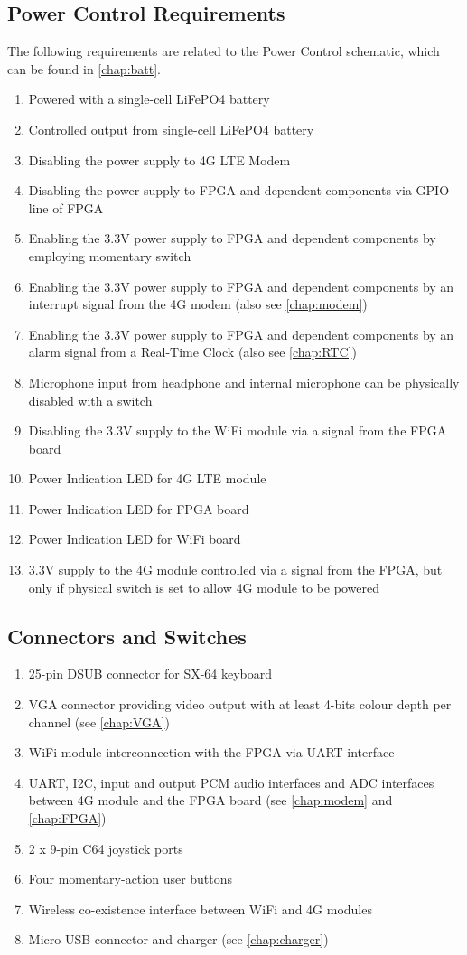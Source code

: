 \subsection{Power Control Requirements}
The following requirements are related to the Power Control schematic, which can be found in \autoref{chap:batt}.
\begin{enumerate}
\item Powered with a single-cell LiFePO4 battery
\item Controlled output from single-cell LiFePO4 battery 
\item Disabling the power supply to 4G LTE Modem
\item Disabling the power supply to FPGA and dependent components via GPIO line of FPGA
\item Enabling the 3.3V power supply to FPGA and dependent components by employing momentary switch
\item Enabling the 3.3V power supply to FPGA and dependent components by an interrupt signal from the 4G modem (also see \autoref{chap:modem})
\item Enabling the 3.3V power supply to FPGA and dependent components by an alarm signal from a Real-Time Clock (also see \autoref{chap:RTC})
\item Microphone input from headphone and internal microphone can be physically disabled with a switch 
\item Disabling the 3.3V supply to the WiFi module via a signal from the FPGA board
\item Power Indication LED for 4G LTE module
\item Power Indication LED for FPGA board 
\item Power Indication LED for WiFi board
\item 3.3V supply to the 4G module controlled via a signal from the FPGA, but only if physical switch is set to allow 4G module to be powered
\end{enumerate}

\subsection{Connectors and Switches}
\begin{enumerate}
\item 25-pin DSUB connector for SX-64 keyboard 
\item VGA connector providing video output with at least 4-bits colour depth per channel (see \autoref{chap:VGA})
\item WiFi module interconnection with the FPGA via UART interface
\item UART, I2C, input and output PCM audio interfaces and ADC interfaces between 4G module and the FPGA board (see \autoref{chap:modem} and \autoref{chap:FPGA})
\item 2 x 9-pin C64 joystick ports
\item Four momentary-action user buttons 
\item Wireless co-existence interface between WiFi and 4G modules 
\item Micro-USB connector and charger (see \autoref{chap:charger})
\end{enumerate}

